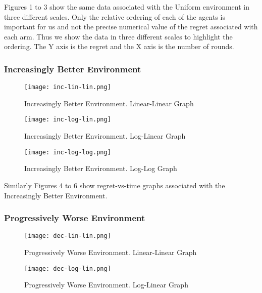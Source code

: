 Figures 1 to 3 show the same data associated with the Uniform environment in three different scales. Only the relative ordering of each of the agents is important for us and not the precise numerical value of the regret associated with each arm. Thus we show the data in three different scales to highlight the ordering. The Y axis is the regret and the X axis is the number of rounds.

\subsubsection{Increasingly Better Environment}

\begin{figure}[ht]
    \centering
    \texttt{[image: inc-lin-lin.png]}
    \caption{Increasingly Better Environment. Linear-Linear Graph}
    \label{fig:i1}
\end{figure}

\begin{figure}[h!]
    \centering
    \texttt{[image: inc-log-lin.png]}
    \caption{Increasingly Better Environment. Log-Linear Graph}
    \label{fig:i2}
\end{figure}

\begin{figure}[h!]
    \centering
    \texttt{[image: inc-log-log.png]}
    \caption{Increasingly Better Environment. Log-Log Graph}
    \label{fig:i3}
\end{figure}

Similarly Figures 4 to 6 show regret-vs-time graphs associated with the Increasingly Better Environment. 

\subsubsection{Progressively Worse Environment}

\begin{figure}[ht]
    \centering
    \texttt{[image: dec-lin-lin.png]}
    \caption{Progressively Worse Environment. Linear-Linear Graph}
    \label{fig:d1}
\end{figure}

\begin{figure}[h!]
    \centering
    \texttt{[image: dec-log-lin.png]}
    \caption{Progressively Worse Environment. Log-Linear Graph}
    \label{fig:d2}
\end{figure}

